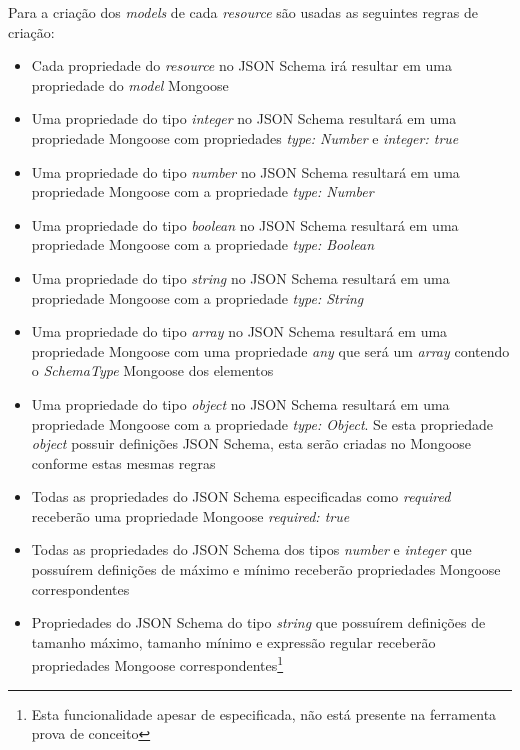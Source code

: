 \label{sec:bnf:mongo}

Para a criação dos \textit{models} de cada \textit{resource} são usadas as seguintes regras de criação:
\begin{itemize}
    \item Cada propriedade do \textit{resource} no JSON Schema irá resultar em uma propriedade do \textit{model} Mongoose

    \item Uma propriedade do tipo \textit{integer} no JSON Schema resultará em uma propriedade Mongoose com propriedades \textit{type: Number} e \textit{integer: true}

    \item Uma propriedade do tipo \textit{number} no JSON Schema resultará em uma propriedade Mongoose com a propriedade \textit{type: Number}

    \item Uma propriedade do tipo \textit{boolean} no JSON Schema resultará em uma propriedade Mongoose com a propriedade \textit{type: Boolean}

    \item Uma propriedade do tipo \textit{string} no JSON Schema resultará em uma propriedade Mongoose com a propriedade \textit{type: String}

    \item Uma propriedade do tipo \textit{array} no JSON Schema resultará em uma propriedade Mongoose com uma propriedade \textit{any} que será um \textit{array} contendo o \textit{SchemaType} Mongoose dos elementos

    \item Uma propriedade do tipo \textit{object} no JSON Schema resultará em uma propriedade Mongoose com a propriedade \textit{type: Object}. Se esta propriedade \textit{object} possuir definições JSON Schema, esta serão criadas no Mongoose conforme estas mesmas regras

    \item Todas as propriedades do JSON Schema especificadas como \textit{required} receberão uma propriedade Mongoose \textit{required: true}

    \item Todas as propriedades do JSON Schema dos tipos \textit{number} e \textit{integer} que possuírem definições de máximo e mínimo receberão propriedades Mongoose correspondentes

    \item Propriedades do JSON Schema do tipo \textit{string} que possuírem definições de tamanho máximo, tamanho mínimo e expressão regular receberão propriedades Mongoose correspondentes\footnote{Esta funcionalidade apesar de especificada, não está presente na ferramenta prova de conceito}

\end{itemize}

